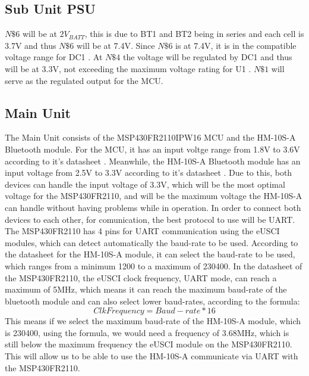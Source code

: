 \subsection{Sub Unit PSU}
$N\$6$ will be at $2V_{BATT}$, this is due to BT1 and BT2 being in series and each cell is 3.7\si{\V} \cite{ICR186502200F} and thus $N\$6$ will be at 7.4\si{\V}. Since $N\$6$ is at 7.4\si{\V}, it is in the compatible voltage range for DC1 \cite{BA033CC0FPE2}. At $N\$4$ the voltage will be regulated by DC1 and thus will be at 3.3\si{\V}, not exceeding the maximum voltage rating for U1 \cite{BA033CC0FPE2}. $N\$1$ will serve as the regulated output for the MCU.
\subsection{Main Unit}
The Main Unit consists of the MSP430FR2110IPW16 MCU and the HM-10S-A Bluetooth module. For the MCU, it has an input voltge range from 1.8\si{\V} to 3.6\si{\V} according to it's datasheet \cite{MSP430FR2110IPW16R}. Meanwhile, the HM-10S-A Bluetooth module has an input voltage from 2.5\si{\V} to 3.3\si{\V} according to it's datasheet \cite{HM10BluetoothModule}. Due to this, both devices can handle the input voltage of 3.3\si{\V}, which will be the most optimal voltage for the MSP430FR2110, and will be the maximum voltage the HM-10S-A can handle without having problems while in operation. In order to connect both devices to each other, for comunication, the best protocol to use will be UART. The MSP430FR2110 has 4 pins for UART communication using the eUSCI modules, which can detect automatically the baud-rate to be used. According to the datasheet for the HM-10S-A module\cite{HM10BluetoothModule}, it can select the baud-rate to be used, which ranges from a minimum 1200 to a maximum of 230400. In the datasheet of the MSP430FR2110, the eUSCI clock frequency, UART mode, can reach a maximum of 5MHz, which means it can reach the maximum baud-rate of the bluetooth module and can also select lower baud-rates, according to the formula:
\begin{equation}
	Clk Frequency= Baud-rate * 16
	\label{eq:UART Frequency}
\end{equation}
This means if we select the maximum baud-rate of the HM-10S-A module, which is 230400, using the formula, we would need a frequency of 3.68MHz, which is still below the maximum frequency the eUSCI module on the MSP430FR2110. This will allow us to be able to use the HM-10S-A communicate via UART with the MSP430FR2110.
